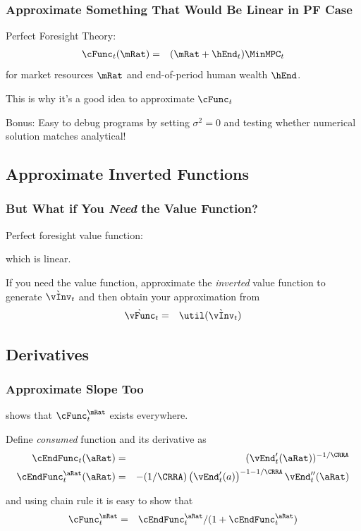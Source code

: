 \documentclass{beamer}
\begin{document}
\begin{frame}
\frametitle{Approximate Something That Would Be Linear in PF Case}

\medskip

Perfect Foresight Theory:
\begin{eqnarray}
  \cFunc_{t}(\mRat) & = & (\mRat+\hEnd_{t})\MinMPC_{t} 
\end{eqnarray}
for market resources $\mRat$ and end-of-period human wealth $\hEnd$.

\medskip\medskip
\pause 

This is why it's a good idea to approximate $\cFunc_{t}$ 

\pause \medskip\medskip

Bonus: Easy to debug programs by setting $\sigma^{2} = 0$ and
testing whether numerical solution matches analytical!

\end{frame}

\subsection{Approximate Inverted Functions}
\begin{frame}%
\frametitle{But What if You {\it Need} the Value Function?}

Perfect foresight value function:

which is linear.  

\medskip\medskip
\pause If you need the value function, approximate the {\it inverted} value function to generate $\grave{\vInv}_{t}$ 
and then obtain your approximation from 
\begin{eqnarray}
  \grave{\vFunc}_{t} & = & \util(\grave{\vInv}_{t})
\end{eqnarray}

\end{frame}

\subsection{Derivatives}
\begin{frame}
\frametitle{Approximate Slope Too}

\cite{BufferStockTheory} shows that $\cFunc^{\mRat}_{t}$ exists everywhere.
\medskip

\pause 
Define {\it consumed} function and its derivative as 
\begin{eqnarray}
  \cEndFunc_{t}(\aRat) & = & (\vEnd^{\prime}_{t}(\aRat))^{-1/\CRRA}
\\ \cEndFunc_{t}^{\aRat}(\aRat) & = & -(1/\CRRA)\left(\vEnd_{t}^{\prime}({a})\right)^{-1-1/\CRRA} \vEnd_{t}^{\prime\prime}(\aRat) 
\end{eqnarray}

\pause 
and using chain rule it is easy to show that
\begin{eqnarray}
 \cFunc^{\mRat}_{t} & = & \cEndFunc^{\aRat}_{t}/(1+\cEndFunc^{\aRat}_{t})
\end{eqnarray}

\end{frame}
\end{document}

